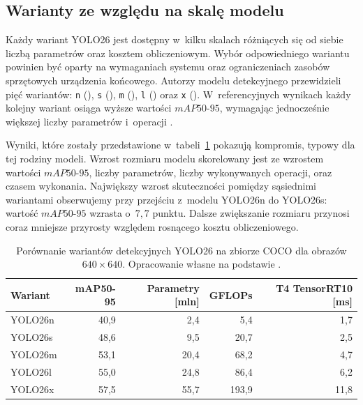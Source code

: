 \subsection{Warianty ze względu na skalę modelu}

Każdy wariant YOLO26 jest dostępny w~kilku skalach różniących się od siebie liczbą parametrów oraz kosztem obliczeniowym. Wybór odpowiedniego wariantu powinien być oparty na wymaganiach systemu oraz ograniczeniach zasobów sprzętowych urządzenia końcowego. Autorzy modelu detekcyjnego przewidzieli pięć wariantów: \texttt{n} (), \texttt{s} (), \texttt{m} (), \texttt{l} () oraz \texttt{x} (). W~referencyjnych wynikach każdy kolejny wariant osiąga wyższe wartości $mAP50\text{-}95$, wymagając jednocześnie większej liczby parametrów i~operacji \cite{bib:ultralyticsYOLO26}.

Wyniki, które zostały przedstawione w~tabeli~\ref{tab:warianty_YOLO} pokazują kompromis, typowy dla tej rodziny modeli. Wzrost rozmiaru modelu skorelowany jest ze wzrostem wartości $mAP50\text{-}95$, liczby parametrów, liczby wykonywanych operacji, oraz czasem wykonania. Największy wzrost skuteczności pomiędzy sąsiednimi wariantami obserwujemy przy przejściu z~modelu YOLO26n do YOLO26s: wartość $mAP50\text{-}95$ wzrasta o~$7,7$ punktu. Dalsze zwiększanie rozmiaru przynosi coraz mniejsze przyrosty względem rosnącego kosztu obliczeniowego.

\begin{table}[H] %
    \centering
    \small
    \renewcommand{\arraystretch}{1.2}
    \caption{Porównanie wariantów detekcyjnych YOLO26 na zbiorze COCO
        dla obrazów $640\times640$. Opracowanie własne na podstawie
        \cite{bib:ultralyticsYOLO26}.}
    \label{tab:warianty_YOLO}
    \begin{tabular}{lrrrr}
        \toprule
        \textbf{Wariant}         &
        \textbf{mAP50-95}        &
        \textbf{Parametry [mln]} &
        \textbf{GFLOPs}          &
        \textbf{T4 TensorRT10 [ms]}                           \\
        \midrule
        YOLO26n                  & 40,9 & 2,4  & 5,4   & 1,7  \\
        YOLO26s                  & 48,6 & 9,5  & 20,7  & 2,5  \\
        YOLO26m                  & 53,1 & 20,4 & 68,2  & 4,7  \\
        YOLO26l                  & 55,0 & 24,8 & 86,4  & 6,2  \\
        YOLO26x                  & 57,5 & 55,7 & 193,9 & 11,8 \\
        \bottomrule
    \end{tabular}
\end{table}


